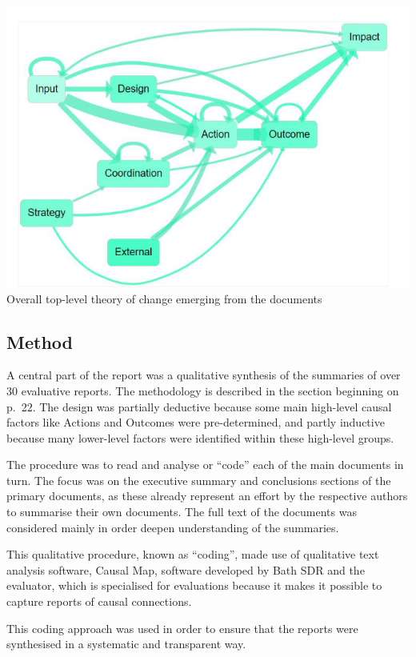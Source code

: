 \documentclass[
]{book}
\begin{document}
\includegraphics{_assets/f184ac06895268db126fca2e3d51ed31.png}Overall top-level theory of change emerging from the documents

\hypertarget{method}{%
\subsection{Method}\label{method}}

A central part of the report was a qualitative synthesis of the summaries of over 30 evaluative reports. The methodology is described in the section beginning on p.~22. The design was partially deductive because some main high-level causal factors like Actions and Outcomes were pre-determined, and partly inductive because many lower-level factors were identified within these high-level groups.

The procedure was to read and analyse or ``code'' each of the main documents in turn.
The focus was on the executive summary and conclusions sections of the primary
documents, as these already represent an effort by the respective authors to summarise
their own documents. The full text of the documents was considered mainly in order
deepen understanding of the summaries.

This qualitative procedure, known as ``coding'', made use of qualitative text analysis
software, Causal Map, software developed by Bath SDR and the evaluator, which is
specialised for evaluations because it makes it possible to capture reports of causal
connections.

This coding approach was used in order to ensure that the reports were
synthesised in a systematic and transparent way.
\end{document}
